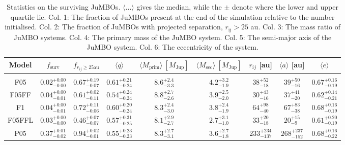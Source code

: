 \documentclass[aa]{aa}
\begin{document}
    \begin{table*}
         \caption{Statistics on the surviving JuMBOs. $\langle ...\rangle$ gives the median, while the $\pm$ denote where the lower and upper quartile lie. Col. 1: The fraction of JuMBOs present at the end of the simulation relative to the number initialised. Col. 2: The fraction of JuMBOs with projected separation, $r_{\mathrm{ij}} > 25$ au. Col. 3: The mass ratio of JuMBO systems. Col. 4: The primary mass of the JuMBO system. Col. 5: The semi-major axis of the JuMBO system. Col. 6: The eccentricity of the system.}
        \label{Tab:SF_Res}
        \centering 
        \begin{tabular}{c c c c c c c c c}
        \hline\hline
        Model & $f_{\mathrm{surv}}$ & $f_{r_{ij} \geq 25\mathrm{ au}}$ & $\langle q\rangle$ & $\langle M_{\mathrm{prim}} \rangle\ [M_{\mathrm{Jup}}]$ & $\langle M_{\mathrm{sec}} \rangle\ [M_{\mathrm{Jup}}]$ & $r_{ij}$ [au] &$\langle a \rangle$ [au] & $\langle e \rangle$\\
        \hline \vspace{-0.75em}\\ 
           F05     & $0.02^{+0.00}_{-0.00}$ & $0.67^{+0.19}_{-0.07}$ & $0.61^{+0.21}_{-0.24}$ & $8.6^{+2.4}_{-3.3}$ & $4.2^{+3.2}_{-1.9}$ & $38^{+52}_{-18}$ & $39^{+50}_{-16}$ & $0.67^{+0.16}_{-0.19}$ \vspace{0.25em}\\
           F05FF   & $0.04^{+0.00}_{-0.01}$ & $0.61^{+0.02}_{-0.11}$ & $0.54^{+0.24}_{-0.24}$ & $8.8^{+2.7}_{-2.6}$ & $3.9^{+2.5}_{-2.0}$ & $30^{+43}_{-16}$ & $37^{+41}_{-20}$ & $0.62^{+0.14}_{-0.21}$ \vspace{0.25em}\\
           F1      & $0.04^{+0.00}_{-0.01}$ & $0.72^{+0.11}_{-0.06}$ & $0.60^{+0.20}_{-0.24}$ & $8.3^{+2.4}_{-3.0}$ & $3.8^{+2.4}_{-1.9}$ & $64^{+98}_{-40}$ & $67^{+83}_{-38}$ & $0.68^{+0.16}_{-0.19}$ \vspace{0.25em}\\
           F05FFL  & $0.03^{+0.00}_{-0.00}$ & $0.46^{+0.07}_{-0.07}$ & $0.57^{+0.31}_{-0.25}$ & $8.1^{+2.9}_{-2.7}$ & $2.7^{+3.1}_{-1.0}$ & $33^{+20}_{-18}$ & $20^{+15}_{-9}$ & $0.61^{+0.20}_{-0.19}$ \vspace{0.25em}\\
           P05     & $0.37^{+0.01}_{-0.02}$ & $0.94^{+0.02}_{-0.01}$ & $0.55^{+0.23}_{-0.23}$ & $8.3^{+2.7}_{-3.1}$ & $3.6^{+2.7}_{-1.8}$ & $233^{+234}_{-137}$ & $268^{+237}_{-152}$ & $0.68^{+0.16}_{-0.22}$ \vspace{0.25em}\\

\end{tabular}
\end{table*}
\end{document}
